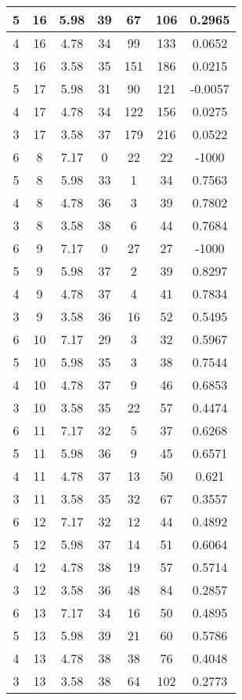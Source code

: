 \documentclass[letterpaper, 12pt]{article}
\begin{document}
\begin{longtable}{|c|c|c|c|c|c|c|}
\hline
5 & 16 & 5.98 & 39 & 67 & 106 & 0.2965 \\
\hline
4 & 16 & 4.78 & 34 & 99 & 133 & 0.0652 \\
\hline
3 & 16 & 3.58 & 35 & 151 & 186 & 0.0215 \\
\hline
5 & 17 & 5.98 & 31 & 90 & 121 & -0.0057 \\
\hline
4 & 17 & 4.78 & 34 & 122 & 156 & 0.0275 \\
\hline
3 & 17 & 3.58 & 37 & 179 & 216 & 0.0522 \\
\hline
6 & 8 & 7.17 & 0 & 22 & 22 & -1000 \\
\hline
5 & 8 & 5.98 & 33 & 1 & 34 & 0.7563 \\
\hline
4 & 8 & 4.78 & 36 & 3 & 39 & 0.7802 \\
\hline
3 & 8 & 3.58 & 38 & 6 & 44 & 0.7684 \\
\hline
6 & 9 & 7.17 & 0 & 27 & 27 & -1000 \\
\hline
5 & 9 & 5.98 & 37 & 2 & 39 & 0.8297 \\
\hline
4 & 9 & 4.78 & 37 & 4 & 41 & 0.7834 \\
\hline
3 & 9 & 3.58 & 36 & 16 & 52 & 0.5495 \\
\hline
6 & 10 & 7.17 & 29 & 3 & 32 & 0.5967 \\
\hline
5 & 10 & 5.98 & 35 & 3 & 38 & 0.7544 \\
\hline
4 & 10 & 4.78 & 37 & 9 & 46 & 0.6853 \\
\hline
3 & 10 & 3.58 & 35 & 22 & 57 & 0.4474 \\
\hline
6 & 11 & 7.17 & 32 & 5 & 37 & 0.6268 \\
\hline
5 & 11 & 5.98 & 36 & 9 & 45 & 0.6571 \\
\hline
4 & 11 & 4.78 & 37 & 13 & 50 & 0.621 \\
\hline
3 & 11 & 3.58 & 35 & 32 & 67 & 0.3557 \\
\hline
6 & 12 & 7.17 & 32 & 12 & 44 & 0.4892 \\
\hline
5 & 12 & 5.98 & 37 & 14 & 51 & 0.6064 \\
\hline
4 & 12 & 4.78 & 38 & 19 & 57 & 0.5714 \\
\hline
3 & 12 & 3.58 & 36 & 48 & 84 & 0.2857 \\
\hline
6 & 13 & 7.17 & 34 & 16 & 50 & 0.4895 \\
\hline
5 & 13 & 5.98 & 39 & 21 & 60 & 0.5786 \\
\hline
4 & 13 & 4.78 & 38 & 38 & 76 & 0.4048 \\
\hline
3 & 13 & 3.58 & 38 & 64 & 102 & 0.2773 \\

\end{longtable}
\end{document}
